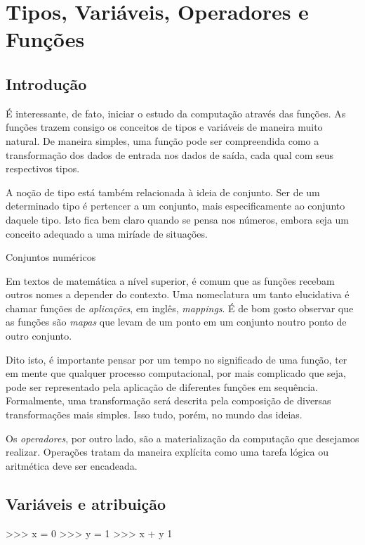 \chapter{Tipos, Variáveis, Operadores e Funções}%

	\section*{Introdução}%
	É interessante, de fato, iniciar o estudo da computação através das funções. As funções trazem consigo os conceitos de tipos e variáveis de maneira muito natural. De maneira simples, uma função pode ser compreendida como a transformação dos dados de entrada nos dados de saída, cada qual com seus respectivos tipos. \par
	
	A noção de tipo está também relacionada à ideia de conjunto. Ser de um determinado tipo é pertencer a um conjunto, mais especificamente ao conjunto daquele tipo. Isto fica bem claro quando se pensa nos números, embora seja um conceito adequado a uma miríade de situações. \par
	\begin{Figure}[f:conjuntos]
		\caption{Conjuntos numéricos}
	\end{Figure}
	Em textos de matemática a nível superior, é comum que as funções recebam outros nomes a depender do contexto. Uma nomeclatura um tanto elucidativa é chamar funções de \textit{aplicações}, em inglês, \textit{mappings}. É de bom gosto observar que as funções são \textit{mapas} que levam de um ponto em um conjunto noutro ponto de outro conjunto. \par

	Dito isto, é importante pensar por um tempo no significado de uma função, ter em mente que qualquer processo computacional, por mais complicado que seja, pode ser representado pela aplicação de diferentes funções em sequência. Formalmente, uma transformação será descrita pela composição de diversas transformações mais simples. Isso tudo, porém, no mundo das ideias. \par

	Os \textit{operadores}, por outro lado, são a materialização da computação que desejamos realizar. Operações tratam da maneira explícita como uma tarefa lógica ou aritmética deve ser encadeada.

	\section*{Variáveis e atribuição}%
	\begin{lstpython}
	>>> x = 0
	>>> y = 1
	>>> x + y
	1
	\end{lstpython}

